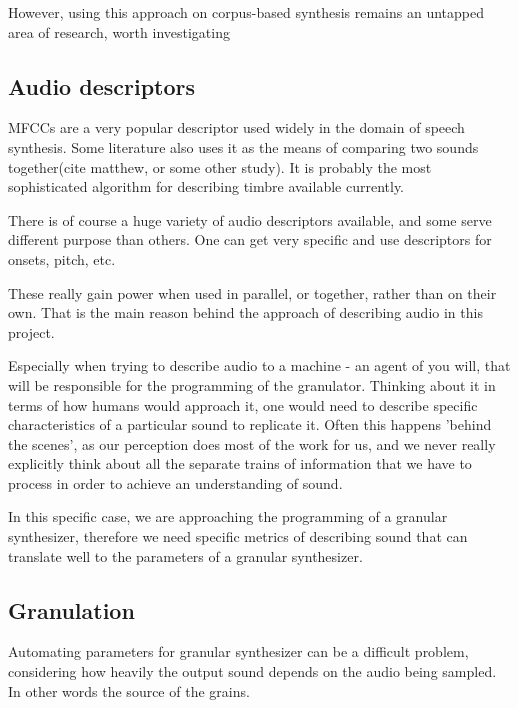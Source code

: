 However, using this approach on corpus-based synthesis remains an untapped area
of research, worth investigating

\subsection{Audio descriptors}

MFCCs are a very popular descriptor used widely in the domain of speech
synthesis. Some literature also uses it as the means of comparing two sounds
together(cite matthew, or some other study). It is probably the most
sophisticated algorithm for describing timbre available currently.

There is of course a huge variety of audio descriptors available, and some
serve different purpose than others. One can get very specific and use
descriptors for onsets, pitch, etc.

These really gain power when used in parallel, or together, rather than on their
own. That is the main reason behind the approach of describing audio in this
project.

Especially when trying to describe audio to a machine - an agent of you will,
that will be responsible for the programming of the granulator. Thinking about
it in terms of how humans would approach it, one would need to describe specific
characteristics of a particular sound to replicate it. Often this happens
'behind the scenes', as our perception does most of the work for us, and we
never really explicitly think about all the separate trains of information that
we have to process in order to achieve an understanding of sound.

In this specific case, we are approaching the programming of a granular
synthesizer, therefore we need specific metrics of describing sound that can
translate well to the parameters of a granular synthesizer.

\subsection{Granulation}

Automating parameters for granular synthesizer can be a difficult problem,
considering how heavily the output sound depends on the audio being sampled. In
other words the source of the grains.

